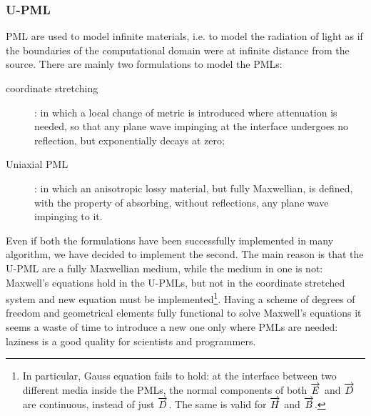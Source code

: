 \subsubsection{U-PML}

PML are used to model infinite materials, i.e. to model the radiation
of light as if the boundaries of the computational domain were at
infinite distance from the source. There are mainly two formulations
to model the PMLs:
\begin{description}
\item[coordinate stretching]: in which a local change of metric is
  introduced where attenuation is needed, so that any plane wave
  impinging at the interface undergoes no reflection, but
  exponentially decays at zero;
\item[Uniaxial PML]: in which an anisotropic lossy material, but fully
  Maxwellian, is defined, with the property of absorbing, without
  reflections, any plane wave impinging to it.
\end{description}

Even if both the formulations have been successfully implemented in
many algorithm, we have decided to implement the second. The main
reason is that the U-PML are a fully Maxwellian medium, while the
medium in one is not: Maxwell's equations hold in the U-PMLs, but not
in the coordinate stretched system and new equation must be
implemented\footnote{In particular, Gauss equation fails to
  hold: at the interface between two different media inside the PMLs,
  the normal components of both $\overrightarrow{E}$ and $\overrightarrow{D}$ are continuous, instead
  of just $\overrightarrow{D}$. The same is valid for $\overrightarrow{H}$ and $\overrightarrow{B}$.}. Having a scheme
of degrees of freedom and geometrical elements fully functional to
solve Maxwell's equations it seems a waste of time to introduce a new
one only where PMLs are needed: laziness is a good quality for
scientists and programmers.

